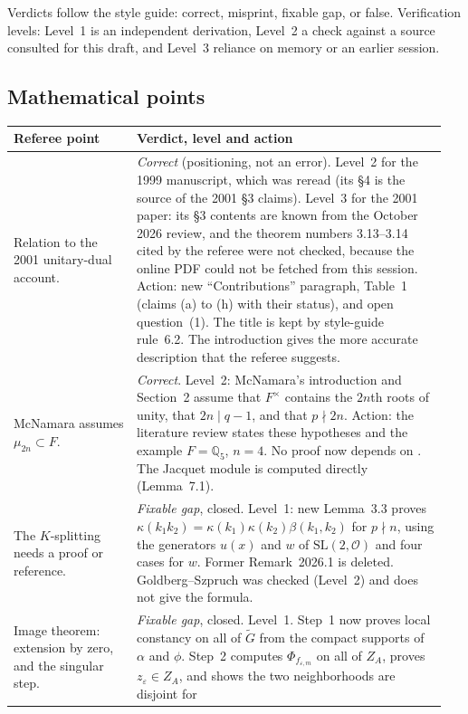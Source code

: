 \documentclass[12pt,letterpaper]{article}
\newcommand{\Gt}{\widetilde G}
\newcommand{\ZA}{Z_A}
\newcommand{\SL}{\mathrm{SL}}
\begin{document}
Verdicts follow the style guide: correct, misprint, fixable gap, or
false. Verification levels: Level~1 is an independent derivation,
Level~2 a check against a source consulted for this draft, and Level~3
reliance on memory or an earlier session.

\subsection{Mathematical points}

\begin{longtable}{@{}>{\raggedright\arraybackslash}p{0.27\linewidth}>{\raggedright\arraybackslash}p{0.68\linewidth}@{}}
\toprule
Referee point & Verdict, level and action\\
\midrule
\endhead
1.1 Relation to the 2001 unitary-dual account. & \emph{Correct}
(positioning, not an error). Level~2 for the 1999 manuscript, which was
reread (its \S4 is the source of the 2001 \S3 claims). Level~3 for the
2001 paper: its \S3 contents are known from the October 2026 review,
and the theorem numbers 3.13--3.14 cited by the referee were not
checked, because the online PDF could not be fetched from this
session. Action: new ``Contributions'' paragraph, Table~1 (claims (a)
to (h) with their status), and open question~(1). The title is kept
by style-guide rule~6.2. The introduction gives the more accurate
description that the referee suggests.\\
1.2 McNamara assumes $\mu_{2n}\subset F$. & \emph{Correct}. Level~2:
McNamara's introduction and Section~2 assume that $F^\times$ contains
the $2n$th roots of unity, that $2n\mid q-1$, and that $p\nmid2n$.
Action: the literature review states these hypotheses and the example
$F=\mathbb Q_5$, $n=4$. No proof now depends on \cite{Mc12}. The
Jacquet module is computed directly (Lemma~7.1).\\
1.3 The $K$-splitting needs a proof or reference. & \emph{Fixable gap},
closed. Level~1: new Lemma~3.3 proves
$\kappa(k_1k_2)=\kappa(k_1)\kappa(k_2)\beta(k_1,k_2)$ for $p\nmid n$,
using the generators $u(x)$ and $w$ of $\SL(2,\mathcal O)$ and four
cases for $w$. Former Remark~2026.1 is deleted. Goldberg--Szpruch was
checked (Level~2) and does not give the formula.\\
1.4 Image theorem: extension by zero, and the singular step. &
\emph{Fixable gap}, closed. Level~1. Step~1 now proves local constancy
on all of $\Gt$ from the compact supports of $\alpha$ and $\phi$.
Step~2 computes $\Phi_{f_{\varepsilon,m}}$ on all of $\ZA$, proves
$z_\varepsilon\in\ZA$, and shows the two neighborhoods are disjoint for

\end{longtable}
\end{document}
